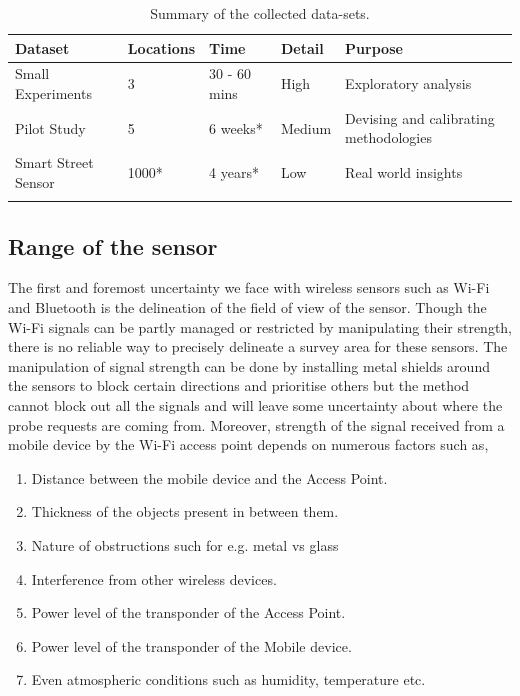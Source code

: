 \begin{table}
  \footnotesize
  \begin{center}
    \begin{tabular}{llllp{3cm}}
      \toprule
      Dataset & Locations & Time & Detail & Purpose\\
      \midrule
      \addlinespace[0.1cm]
      Small Experiments & 3 & 30 - 60 mins & High & Exploratory analysis\\
      \addlinespace[0.2cm]
      Pilot Study & 5 & 6 weeks* & Medium & Devising and calibrating methodologies\\
      \addlinespace[0.2cm]
      Smart Street Sensor & 1000* & 4 years* & Low & Real world insights\\
      \addlinespace[0.1cm]
      \bottomrule
    \end{tabular}
  \end{center}
  \caption{Summary of the collected data-sets.}
  \label{table:collection:discussion:summary}
\end{table}


\subsection{Range of the sensor}
The first and foremost uncertainty we face with wireless sensors such as Wi-Fi and Bluetooth is the delineation of the field of view of the sensor.
Though the Wi-Fi signals can be partly managed or restricted by manipulating their strength, there is no reliable way to precisely delineate a survey area for these sensors. 
The manipulation of signal strength can be done by installing metal shields around the sensors to block certain directions and prioritise others but the method cannot block out all the signals and will leave some uncertainty about where the probe requests are coming from.
Moreover, strength of the signal received from a mobile device by the Wi-Fi access point depends on numerous factors such as,

\begin{enumerate}
  \setlength{\itemindent}{2em}
  \itemsep-0.5em
  \item Distance between the mobile device and the Access Point.
  \item Thickness of the objects present in between them.
  \item Nature of obstructions such for e.g. metal vs glass
  \item Interference from other wireless devices.
  \item Power level of the transponder of the Access Point.
  \item Power level of the transponder of the Mobile device.
  \item Even atmospheric conditions such as humidity, temperature etc.
\end{enumerate}

